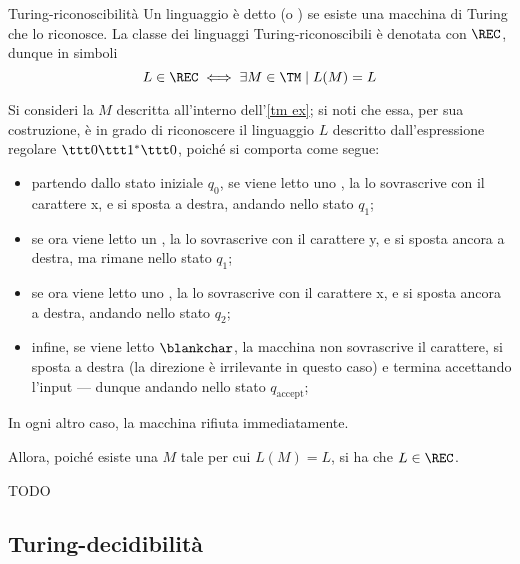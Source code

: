 \documentclass[a4paper, 12pt]{report}
\begin{document}
    \begin{frameddefn}{Turing-riconoscibilità}
        Un linguaggio è detto  (o ) se esiste una macchina di Turing che lo riconosce. La classe dei linguaggi Turing-riconoscibili è denotata con $\mathrm{\REC}$, dunque in simboli $$L \in \mathrm{\REC} \iff \exists M \in \mathrm{\TM} \mid L(M) = L$$
    \end{frameddefn}

    \begin{example}
        Si consideri la \TM $M$ descritta all'interno dell'\cref{tm ex}; si noti che essa, per sua costruzione, è in grado di riconoscere il linguaggio $L$ descritto dall'espressione regolare $\ttt 0 \ttt 1^* \ttt 0$, poiché si comporta come segue:

        \begin{itemize}
            \item partendo dallo stato iniziale $q_0$, se viene letto uno , la \TM lo sovrascrive con il carattere \ttt x, e si sposta a destra, andando nello stato $q_1$;
            \item se ora viene letto un , la \TM lo sovrascrive con il carattere \ttt y, e si sposta ancora a destra, ma rimane nello stato $q_1$;
            \item se ora viene letto uno , la \TM lo sovrascrive con il carattere \ttt x, e si sposta ancora a destra, andando nello stato $q_2$;
            \item infine, se viene letto $\blankchar$, la macchina non sovrascrive il carattere, si sposta a destra (la direzione è irrilevante in questo caso) e termina accettando l'input --- dunque andando nello stato $q_\mathrm{accept}$;
        \end{itemize}

        In ogni altro caso, la macchina rifiuta immediatamente.

        Allora, poiché esiste una \TM $M$ tale per cui $L(M) = L$, si ha che $L \in \mathrm{\REC}$.
    \end{example}

    \begin{example}
        TODO
    \end{example}

    \subsection{Turing-decidibilità}
\end{document}
